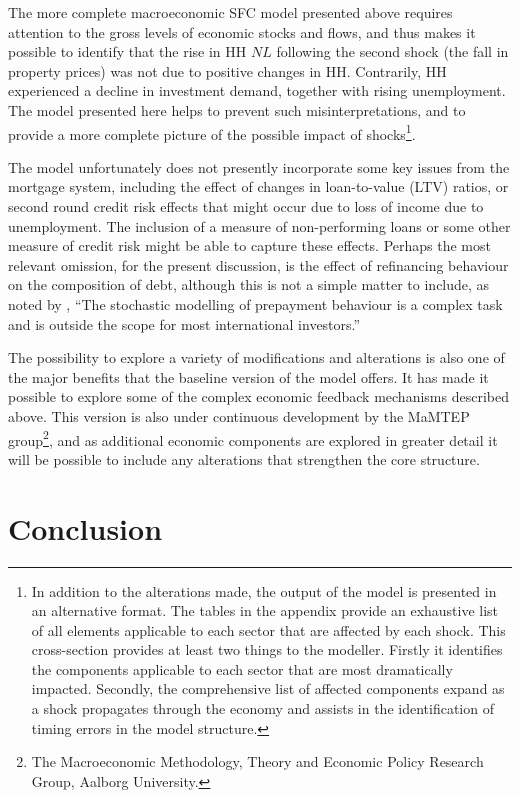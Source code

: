 \documentclass[
]{book}
\begin{document}
The more complete macroeconomic SFC model presented above requires attention to the gross levels of economic stocks and flows, and thus makes it possible to identify that the rise in HH \(NL\) following the second shock (the fall in property prices) was not due to positive changes in HH. Contrarily, HH experienced a decline in investment demand, together with rising unemployment. The model presented here helps to prevent such misinterpretations, and to provide a more complete picture of the possible impact of shocks\footnote{In addition to the alterations made, the output of the model is presented in an alternative format. The tables in the appendix provide an exhaustive list of all elements applicable to each sector that are affected by each shock. This cross-section provides at least two things to the modeller. Firstly it identifies the components applicable to each sector that are most dramatically impacted. Secondly, the comprehensive list of affected components expand as a shock propagates through the economy and assists in the identification of timing errors in the model structure.}.

The model unfortunately does not presently incorporate some key issues from the mortgage system, including the effect of changes in loan-to-value (LTV) ratios, or second round credit risk effects that might occur due to loss of income due to unemployment. The inclusion of a measure of non-performing loans or some other measure of credit risk might be able to capture these effects. Perhaps the most relevant omission, for the present discussion, is the effect of refinancing behaviour on the composition of debt, although this is not a simple matter to include, as noted by \citet[pp.~19]{Skinhoj2019}, ``The stochastic modelling of prepayment behaviour is a complex task and is outside the scope for most international investors.''

The possibility to explore a variety of modifications and alterations is also one of the major benefits that the baseline version of the model offers. It has made it possible to explore some of the complex economic feedback mechanisms described above. This version is also under continuous development by the MaMTEP group\footnote{The Macroeconomic Methodology, Theory and Economic Policy Research Group, Aalborg University.}, and as additional economic components are explored in greater detail it will be possible to include any alterations that strengthen the core structure.

\hypertarget{sec:fi-fl-sfc-conclusion}{%
\section{Conclusion}\label{sec:fi-fl-sfc-conclusion}}
\end{document}
